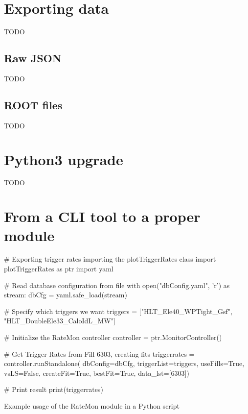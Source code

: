 \section{Exporting data}

TODO

\subsection{Raw JSON}

TODO

\subsection{ROOT files}

TODO

\section{Python3 upgrade}

TODO

\section{From a CLI tool to a proper module}

\begin{listing}[ht]
\begin{pythoncode}
# Exporting trigger rates importing the plotTriggerRates class
import plotTriggerRates as ptr
import yaml

# Read database configuration from file
with open("dbConfig.yaml", 'r') as stream:
    dbCfg = yaml.safe_load(stream)

# Specify which triggers we want
triggers = ["HLT_Ele40_WPTight_Gsf",
              "HLT_DoubleEle33_CaloIdL_MW"]

# Initialize the RateMon controller
controller = ptr.MonitorController()

# Get Trigger Rates from Fill 6303, creating fits
triggerrates = controller.runStandalone(
                         dbConfig=dbCfg,
                         triggerList=triggers,
                         useFills=True,
                         vsLS=False,
                         createFit=True,
                         bestFit=True,
                         data_lst=[6303])

# Print result
print(triggerrates)
\end{pythoncode}
\caption{Example usage of the RateMon module in a Python script}
\end{listing}

